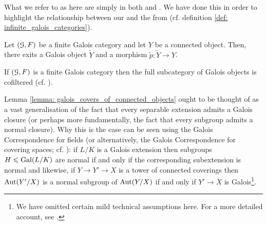             \begin{remark}
                What we refer to as  here are simply  in both \cite[Expos\'e V]{SGA1} and \cite[\href{https://stacks.math.columbia.edu/tag/0BMQ}{Tag 0BMQ}]{stacks}. We have done this in order to highlight the relationship between our  and the  from \cite[Section 7]{bhatt_scholze_2014_pro_etale} (cf. definition \ref{def: infinite_galois_categories}).
            \end{remark}
            
            \begin{lemma} \label{lemma: galois_covers_of_connected_objects}
                \cite[\href{https://stacks.math.columbia.edu/tag/0BN2}{Tag 0BN2}]{stacks} Let $(\mathcal{G}, F)$ be a finite Galois category and let $Y$ be a connected object. Then, there exits a Galois object $\tilde{Y}$ and a morphism $\tilde{p}: \tilde{Y} \to Y$.
            \end{lemma} 
            \begin{corollary} \label{coro: cofiltered_diagrams_of_Galois_objects_in_a_finite_Galois_category}
                If $(\mathcal{G}, F)$ is a finite Galois category then the full subcategory of Galois objects is cofiltered (cf. \cite[\href{https://stacks.math.columbia.edu/tag/00D3}{Tag 00D3}]{stacks}).
            \end{corollary}
            \begin{remark}
                Lemma \ref{lemma: galois_covers_of_connected_objects} ought to be thought of as a vast generalisation of the fact that every separable extension admits a Galois closure (or perhaps more fundamentally, the fact that every subgroup admits a normal closure). Why this is the case can be seen using the Galois Correspondence for fields (or alternatively, the Galois Correspondence for covering spaces; cf. \cite[Theorem 1.38]{hatcher2002algebraic}): if $L/K$ is a Galois extension then subgroups $H \leqslant \mathrm{Gal}(L/K)$ are normal if and only if the corresponding subextension is normal and likewise, if $Y \to Y' \to X$ is a tower of connected coverings then $\mathrm{Aut}(Y'/X)$ is a normal subgroup of $\mathrm{Aut}(Y/X)$ if and only if $Y' \to X$ is Galois\footnote{We have omitted certain mild technical assumptions here. For a more detailed account, see \cite[Section 1.3]{hatcher2002algebraic}.}. 
            \end{remark}
